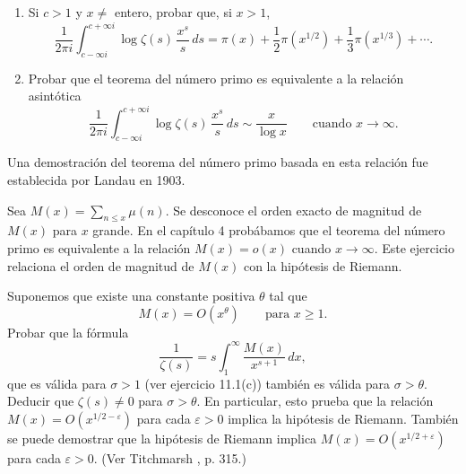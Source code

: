 \documentclass[12pt,a4paper]{book}
\begin{document}
    \begin{ejercicio}
        \begin{enumerate}
            \item[(a)] Si $c>1$ y $x\neq$ entero, probar que, si $x>1$,
            \begin{equation*}
                \frac{1}{2\pi i}\int_{c-\infty i}^{c+\infty i}\log\zeta(s)\,\frac{x^{s}}{s}\,ds=\pi(x)+\frac{1}{2}\pi(x^{1/2})+\frac{1}{3}\pi(x^{1/3})+\cdots.
            \end{equation*}
            \item[(b)] Probar que el teorema del número primo es equivalente a la relación
            asintótica
            \begin{equation*}
                \frac{1}{2\pi i}\int_{c-\infty i}^{c+\infty i}\log\zeta(s)\,\frac{x^{s}}{s}\,ds\sim\frac{x}{\log x}\qquad\text{cuando }x\to\infty.
            \end{equation*}
        \end{enumerate}
        Una demostración del teorema del número primo basada en esta relación fue establecida
        por Landau en 1903.
    \end{ejercicio}

    \begin{ejercicio}
        Sea $M(x)=\sum_{n\leq x}\mu(n)$. Se desconoce el orden exacto de magnitud de $M(x)$ para
        $x$ grande. En el capítulo 4 probábamos que el teorema del número primo es equivalente a
        la relación $M(x)=o(x)$ cuando $x\to\infty$. Este ejercicio relaciona el orden de
        magnitud de $M(x)$ con la hipótesis de Riemann.

        Suponemos que existe una constante positiva $\theta$ tal que
        \begin{equation*}
            M(x)=O(x^{\theta})\qquad\text{para }x\geq1.
        \end{equation*}
        Probar que la fórmula
        \begin{equation*}
            \frac{1}{\zeta(s)}=s\int_{1}^{\infty}\frac{M(x)}{x^{s+1}}\,dx,
        \end{equation*}
        que es válida para $\sigma>1$ (ver ejercicio 11.1(c)) también es válida para
        $\sigma>\theta$. Deducir que $\zeta(s)\neq0$ para $\sigma>\theta$. En particular, esto
        prueba que la relación $M(x)=O(x^{1/2-\varepsilon})$ para cada $\varepsilon>0$ implica
        la hipótesis de Riemann. También se puede demostrar que la hipótesis de Riemann implica
        $M(x)=O(x^{1/2+\varepsilon})$ para cada $\varepsilon>0$. (Ver Titchmarsh
        \cite{titchmarsh1951}, p. 315.)
    \end{ejercicio}
\end{document}
